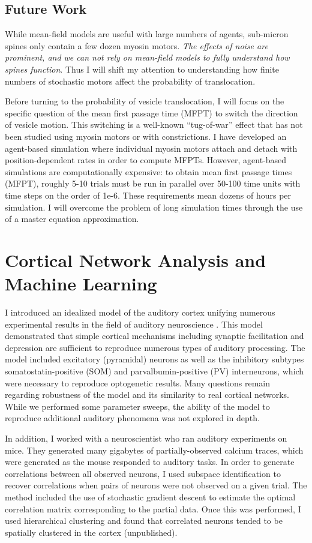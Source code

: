 \documentclass[a4paper,11pt]{article}
\begin{document}
\subsection{Future Work}
While mean-field models are useful with large numbers of agents, sub-micron spines only contain a few dozen myosin motors. \textit{The effects of noise are prominent, and we can not rely on mean-field models to fully understand how spines function}. Thus I will shift my attention to understanding how finite numbers of stochastic motors affect the probability of translocation.

Before turning to the probability of vesicle translocation, I will focus on the specific question of the mean first passage time (MFPT) to switch the direction of vesicle motion. This switching is a well-known ``tug-of-war'' effect \cite{julicher1995cooperative} that has not been studied using myosin motors or with constrictions. I have developed an agent-based simulation where individual myosin motors attach and detach with position-dependent rates in order to compute MFPTs. However, agent-based simulations are computationally expensive: to obtain mean first passage times (MFPT), roughly 5-10 trials must be run in parallel over 50-100 time units with time steps on the order of 1e-6. These requirements mean dozens of hours per simulation. I will overcome the problem of long simulation times through the use of a master equation approximation.


\section{Cortical Network Analysis and Machine Learning}\label{sec:data}

I introduced an idealized model of the auditory cortex unifying numerous experimental results in the field of auditory neuroscience \cite{park2020circuit}. This model demonstrated that simple cortical mechanisms including synaptic facilitation and depression are sufficient to reproduce numerous types of auditory processing. The model included excitatory (pyramidal) neurons as well as the inhibitory subtypes somatostatin-positive (SOM) and parvalbumin-positive (PV) interneurons, which were necessary to reproduce optogenetic results. Many questions remain regarding robustness of the model and its similarity to real cortical networks. While we performed some parameter sweeps, the ability of the model to reproduce additional auditory phenomena was not explored in depth.

In addition, I worked with a neuroscientist who ran auditory experiments on mice. They generated many gigabytes of partially-observed calcium traces, which were generated as the mouse responded to auditory tasks. In order to generate correlations between all observed neurons, I used subspace identification to recover correlations when pairs of neurons were not observed on a given trial. The method included the use of stochastic gradient descent to estimate the optimal correlation matrix corresponding to the partial data. Once this was performed, I used hierarchical clustering and found that correlated neurons tended to be spatially clustered in the cortex (unpublished).
\end{document}

